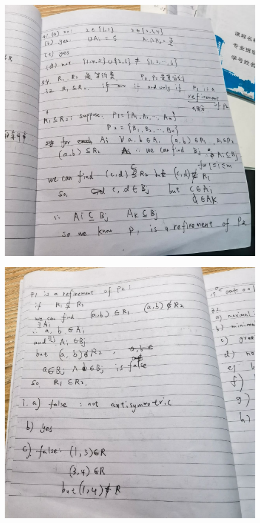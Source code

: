 \documentclass{article}
\begin{document}
    \begin{figure}[H]
    \centering
    \includegraphics[width=1\textwidth]{hw10/IMG_20221205_183732.jpg}
    \caption{\label{Lab9}}
    \end{figure}

    \begin{figure}[H]
    \centering
    \includegraphics[width=1\textwidth]{hw10/IMG_20221205_183737.jpg}
    \caption{\label{Lab9}}
    \end{figure}
   
\end{document}

